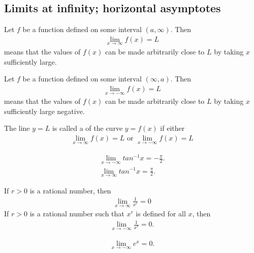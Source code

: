\documentclass{article}
\begin{document}
\subsection{Limits at infinity; horizontal asymptotes}
\begin{definition}
    Let $f$ be a function defined on some interval $(a,\infty)$. Then
    \begin{align*}
        \lim_{x\to\infty}f(x)=L
    \end{align*}
    means that the values of $f(x)$ can be made arbitrarily close to $L$ by taking $x$ sufficiently large.
\end{definition}
\begin{definition}
    Let $f$ be a function defined on some interval $(\infty, a)$. Then
    \begin{align*}
        \lim_{x\to -\infty}f(x)=L
    \end{align*}
    means that the values of $f(x)$ can be made arbitrarily close to $L$ by taking $x$ sufficiently large negative.
\end{definition}
\begin{definition}
    The line $y=L$ is called a  of the curve $y=f(x)$ if either
    \begin{align*}
        \lim_{x\to \infty}f(x)=L \text{ or } \lim_{x\to-\infty}f(x)=L
    \end{align*}
\end{definition}
\begin{theorem}
    \begin{align*}
        \lim_{x\to-\infty}tan^{-1}x=-\frac{\pi}{2}.\\
        \lim_{x\to\infty}tan^{-1}x=\frac{\pi}{2}.
    \end{align*}
\end{theorem}
\begin{theorem}
    If $r>0$ is a rational number, then
    \begin{align*}
        \lim_{x\to\infty}\frac{1}{x^r}=0
    \end{align*}
    If $r>0$ is a rational number such that $x^r$ is defined for all $x$, then
    \begin{align*}
        \lim_{x\to-\infty}\frac{1}{x^r}=0.
    \end{align*}
\end{theorem}
\begin{theorem}
    \begin{align*}
        \lim_{x\to-\infty}e^x=0.
    \end{align*}
\end{theorem}
\end{document}
